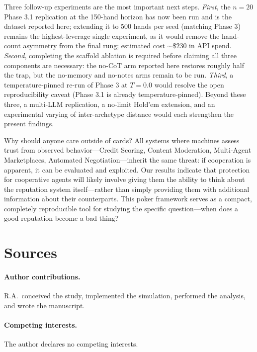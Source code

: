 \documentclass[10pt,twocolumn,letterpaper]{article}
\begin{document}
Three follow-up experiments are the most important next steps.
\textit{First}, the $n = 20$ Phase 3.1 replication at the 150-hand horizon has now been run and is the dataset reported here; extending it to 500 hands per seed (matching Phase 3) remains the highest-leverage single experiment, as it would remove the hand-count asymmetry from the final rung; estimated cost ${\sim}\$230$ in API spend.
\textit{Second}, completing the scaffold ablation is required before claiming all three components are necessary: the no-CoT arm reported here restores roughly half the trap, but the no-memory and no-notes arms remain to be run.
\textit{Third}, a temperature-pinned re-run of Phase 3 at $T = 0.0$ would resolve the open reproducibility caveat (Phase 3.1 is already temperature-pinned).
Beyond these three, a multi-LLM replication, a no-limit Hold'em
extension, and an experimental varying of inter-archetype distance
would each strengthen the present findings.

Why should anyone care outside of cards? All systems where machines
assess trust from observed behavior---Credit Scoring, Content
Moderation, Multi-Agent Marketplaces, Automated Negotiation---inherit
the same threat: if cooperation is apparent, it can be evaluated and
exploited. Our results indicate that protection for cooperative
agents will likely involve giving them the ability to think about the
reputation system itself---rather than simply providing them with
additional information about their counterparts. This poker framework
serves as a compact, completely reproducible tool for studying the
specific question---when does a good reputation become a bad thing?

\section*{Sources}

\paragraph*{Author contributions.} R.A.\ conceived the study,
implemented the simulation, performed the analysis, and wrote the
manuscript.

\paragraph*{Competing interests.} The author declares no competing
interests.
\end{document}
